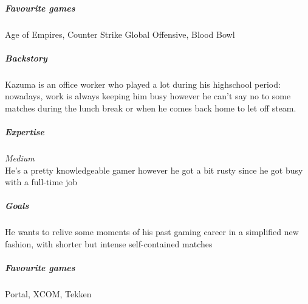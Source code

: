 \subparagraph{Favourite games}
Age of Empires, Counter Strike Global Offensive, Blood Bowl

\vspace{5mm}



\subparagraph{Backstory}
Kazuma is an office worker who played a lot during his highschool period: nowadays, work is always keeping him busy however he can't say no to some matches during the lunch break or when he comes back home to let off steam.

\subparagraph{Expertise}
\textit{Medium} \\ 
He's a pretty knowledgeable gamer however he got a bit rusty since he got busy with a full-time job

\subparagraph{Goals}
He wants to relive some moments of his past gaming career in a simplified new fashion, with shorter but intense self-contained matches

\subparagraph{Favourite games}
Portal, XCOM, Tekken 